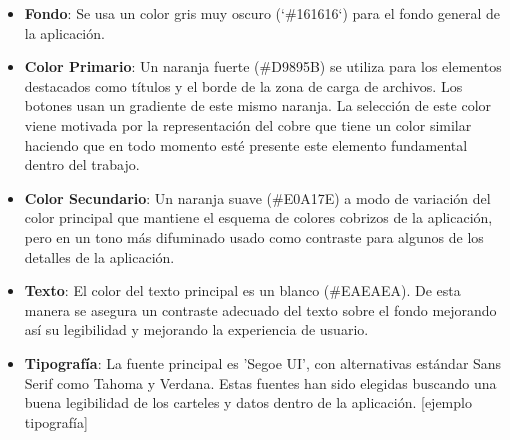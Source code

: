 \begin{itemize}
    \item \textbf{Fondo}: Se usa un color gris muy oscuro (`\#161616`) para el fondo general de la aplicación. 
    \item \textbf{Color Primario}: Un naranja fuerte  (\#D9895B) se utiliza para los elementos destacados como títulos y el borde de la zona de carga de archivos. Los botones usan un gradiente de este mismo naranja. La selección de este color viene motivada por la representación del cobre que tiene un color similar haciendo que en todo momento esté presente este elemento fundamental dentro del trabajo. 
\item \textbf{Color Secundario}: Un naranja suave (\#E0A17E) a modo de variación del color principal que mantiene el esquema de colores cobrizos de la aplicación, pero en un tono más difuminado usado como contraste para algunos de los detalles de la aplicación.

    \item \textbf{Texto}: El color del texto principal es un blanco (\#EAEAEA). De esta manera se asegura un contraste adecuado del texto sobre el fondo mejorando así su legibilidad y mejorando la experiencia de usuario.
    \item \textbf{Tipografía}: La fuente principal es 'Segoe UI', con alternativas estándar Sans Serif como Tahoma y Verdana. Estas fuentes han sido elegidas buscando una buena legibilidad de los carteles y datos dentro de la aplicación. [ejemplo tipografía]
\end{itemize}

